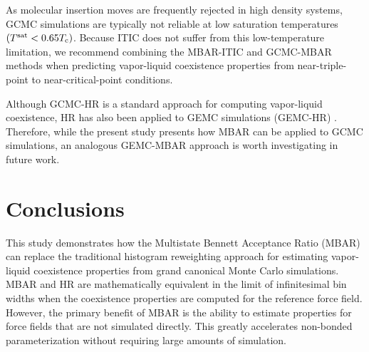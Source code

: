 \documentclass[journal=jced,manuscript=article]{achemso}
\begin{document}





As molecular insertion moves are frequently rejected in high density systems, GCMC simulations are typically not reliable at low saturation temperatures $(T^{\rm sat} < 0.65 T_{\rm c})$. Because ITIC does not suffer from this low-temperature limitation, we recommend combining the MBAR-ITIC and GCMC-MBAR methods when predicting vapor-liquid coexistence properties from near-triple-point to near-critical-point conditions.

Although GCMC-HR is a standard approach for computing vapor-liquid coexistence, HR has also been applied to GEMC simulations (GEMC-HR) \cite{Boulougouris2010}. Therefore, while the present study presents how MBAR can be applied to GCMC simulations, an analogous GEMC-MBAR approach is worth investigating in future work.

%

\section{Conclusions} \label{sec: Conclusions}

This study demonstrates how the Multistate Bennett Acceptance Ratio (MBAR) can replace the traditional histogram reweighting approach for estimating vapor-liquid coexistence properties from grand canonical Monte Carlo simulations. MBAR and HR are mathematically equivalent in the limit of infinitesimal bin widths when the coexistence properties are computed for the reference force field. However, the primary benefit of MBAR is the ability to estimate properties for force fields that are not simulated directly. This greatly accelerates non-bonded parameterization without requiring large amounts of simulation. 
\end{document}

